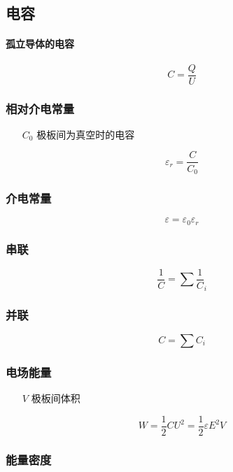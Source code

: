 \documentclass{article}
\begin{document}
\subsection{电容}

\paragraph{孤立导体的电容}

\[C=\frac QU\]

\subsubsection{相对介电常量}

\begin{enumerate}
    \item[$C_0$] 极板间为真空时的电容
\end{enumerate}

\[\varepsilon_r=\frac C{C_0}\]

\subsubsection{介电常量}

\[\varepsilon=\varepsilon_0\varepsilon_r\]

\subsubsection{串联}

\[\frac1C=\sum\frac1C_i\]

\subsubsection{并联}

\[C=\sum C_i\]

\subsubsection{电场能量}

\begin{enumerate}
    \item[$V$] 极板间体积
\end{enumerate}

\[W=\frac12CU^2=\frac12\varepsilon E^2V\]

\subsubsection{能量密度}
\end{document}
